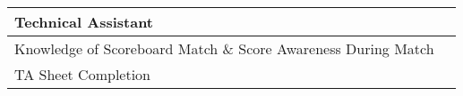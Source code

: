 \documentclass[10pt]{article}
\begin{document}
\begin{center}
\begin{tabular}{|M{0.85\textwidth}|C{0.10\textwidth}|}
        \textbf{Technical Assistant} &  \\ \hline
        Knowledge of Scoreboard	Match \& Score Awareness During Match & \\ \hline
        TA Sheet Completion & \\ \hline
    \end{tabular}

    \vspace{.02\textwidth}

\end{center}
\end{document}
